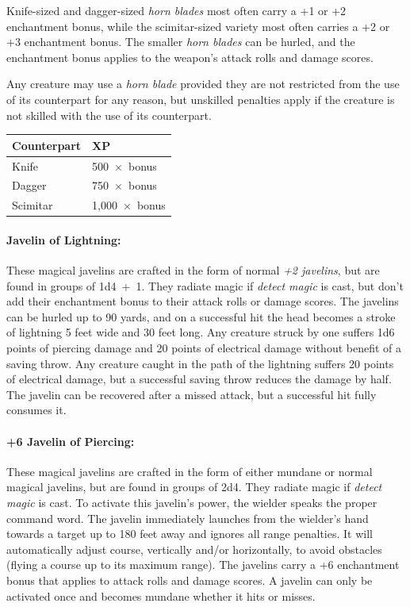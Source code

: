 \begin{multicols}{2}
Knife-sized and dagger-sized \textit{horn blades} most often carry a +1 or +2 enchantment bonus, while the scimitar-sized variety most often carries a +2 or +3 enchantment bonus.  The smaller \textit{horn blades} can be hurled, and the enchantment bonus applies to the weapon's attack rolls and damage scores.

Any creature may use a \textit{horn blade} provided they are not restricted from the use of its counterpart for any reason, but unskilled penalties apply if the creature is not skilled with the use of its counterpart.

\noindent \begin{tabular}{|p{}|p{}|}
\hline
Counterpart	& XP \\
\hline\hline
\rowcolor[gray]{0.9}Knife	& 500~$\times$~bonus \\
Dagger	& 750~$\times$~bonus \\
\rowcolor[gray]{0.9}Scimitar	& 1,000~$\times$~bonus \\
\hline
\end{tabular}

\paragraph{Javelin of Lightning:} These magical javelins are crafted in the form of normal \textit{+2 javelins}, but are found in groups of 1d4~+~1.  They radiate magic if \textit{detect magic} is cast, but don't add their enchantment bonus to their attack rolls or damage scores.  The javelins can be hurled up to 90 yards, and on a successful hit the head becomes a stroke of lightning 5 feet wide and 30 feet long.  Any creature struck by one suffers 1d6 points of piercing damage and 20 points of electrical damage without benefit of a saving throw.  Any creature caught in the path of the lightning suffers 20 points of electrical damage, but a successful saving throw reduces the damage by half.  The javelin can be recovered after a missed attack, but a successful hit fully consumes it.

\paragraph{+6 Javelin of Piercing:} These magical javelins are crafted in the form of either mundane or normal magical javelins, but are found in groups of 2d4.  They radiate magic if \textit{detect magic} is cast.  To activate this javelin's power, the wielder speaks the proper command word.  The javelin immediately launches from the wielder's hand towards a target up to 180 feet away and ignores all range penalties.  It will automatically adjust course, vertically and/or horizontally, to avoid obstacles (flying a course up to its maximum range).  The javelins carry a +6 enchantment bonus that applies to attack rolls and damage scores.  A javelin can only be activated once and becomes mundane whether it hits or misses.


\end{multicols}
